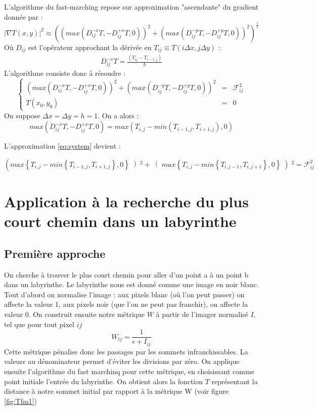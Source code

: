 \documentclass{article}
\begin{document}
L'algorithme du fast-marching repose sur approximation "ascendante" du gradient donnée par :
\begin{equation}
|\nabla T(x,y)|^2 \approx 
\left(
\left( max \left( D_{ij}^{-x}T,-D_{ij}^{+x}T,0 \right)
\right)^2  +
\left( max \left( D_{ij}^{-y}T,-D_{ij}^{+y}T,0 \right)
\right)^2
\right)^{\frac{1}{2}}
\end{equation}
 Où $D_{ij}$ est l'opérateur approchant la dérivée en $T_{ij} \equiv T(i\Delta x,j\Delta y)$ :
 \begin{eqnarray}
 D_{ij}^{-x}T = \frac{\left(T_{ij} - T_{i-1,j}\right)}{h}
 \end{eqnarray}
 L'algorithme consiste donc à résoudre :
 \begin{equation}
 \left\{
 \begin{array}{lrc}
 \left( max \left( D_{ij}^{-x}T,-D_{ij}^{+x}T,0 \right)
 \right)^2  +
 \left( max \left( D_{ij}^{-y}T,-D_{ij}^{+y}T,0 \right)
 \right)^2
  & = & \mathcal{F}_{ij}^2 \\
 T(x_0,y_0) & = &0 
 \end{array}
 \right.
 \label{eq:system}
 \end{equation}
On suppose $\Delta x = \Delta y = h = 1$. On a alors :
\[
max \left( D_{ij}^{-x}T,-D_{ij}^{+x}T,0 \right) = 
max \left(T_{i,j} - min\left(T_{i-1,j},T_{i+1,j}\right),0\right)
\]

L'approximation \ref{eq:system} devient :

\begin{equation}
\left(max \left\{T_{i,j} - min\left\{T_{i-1,j},T_{i+1,j}\right\},0\right\}\left)^2
+
\right(max \left\{T_{i,j} - min\left\{T_{i,j-1},T_{i,j+1}\right\},0\right\}\left)^2 
= \mathcal{F}_{ij}^2
\end{equation}





\section{Application à la recherche du plus court chemin dans un labyrinthe}
\subsection{Première approche}
On cherche à trouver le plus court chemin pour aller d'un point a à un point b dans un labyrinthe. Le labyrinthe nous est donné comme une image en noir blanc. Tout d'abord on normalise l'image : aux pixels blanc (où l'on peut passer) on affecte la valeur 1, aux pixels noir (que l'on ne peut pas franchir), on affecte la valeur 0. On construit ensuite notre métrique $W$ à partir de l'imager normalisé $I$, tel que pour tout pixel $ij$
\begin{equation}
W_{ij}  = \frac{1}{\epsilon+I_{ij}}
\end{equation}
Cette métrique pénalise donc les passages par les sommets infranchissables. La valeur$\epsilon$ au dénominateur permet d'éviter les divisions par zéro.
On applique ensuite l'algorithme du fast marchinq pour cette métrique, en choisissant comme point initiale l'entrée du labyrinthe. On obtient alors la fonction $T$ représentant la distance à notre sommet initial par rapport à la métrique W (voir figure \ref{fig:Tfm1})
\end{document}
